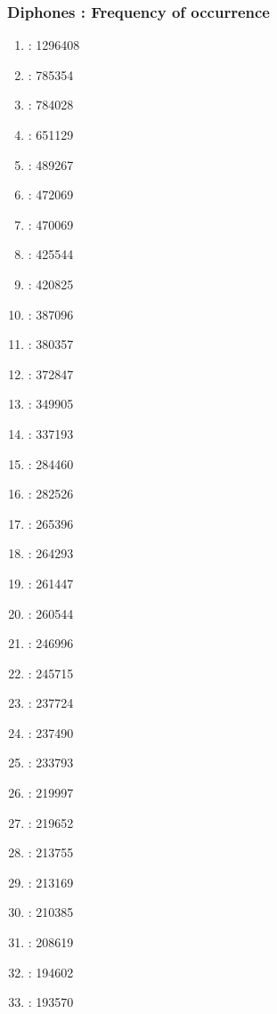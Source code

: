 \documentclass{beamer}
\begin{document}
\frame
{
  \frametitle{Diphones : Frequency of occurrence}

\begin{tiny}
\begin{multicols}{4}
\begin{enumerate}
    \item {} : 1296408
    \item {} : 785354
    \item {} : 784028
    \item {} : 651129
    \item {} : 489267
    \item {} : 472069
    \item {} : 470069
    \item {} : 425544
    \item {} : 420825
    \item {} : 387096
    \item {} : 380357
    \item {} : 372847
    \item {} : 349905
    \item {} : 337193
    \item {} : 284460
    \item {} : 282526
    \item {} : 265396
    \item {} : 264293
    \item {} : 261447
    \item {} : 260544
    \item {} : 246996
    \item {} : 245715
    \item {} : 237724
    \item {} : 237490
    \item {} : 233793
    \item {} : 219997
    \item {} : 219652
    \item {} : 213755
    \item {} : 213169
    \item {} : 210385
    \item {} : 208619
    \item {} : 194602
    \item {} : 193570

\end{enumerate}
\end{multicols}
\end{tiny}}
\end{document}
